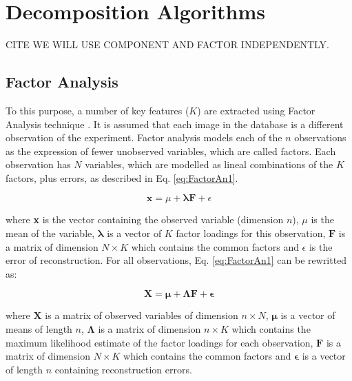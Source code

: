 \section{Decomposition Algorithms}
CITE WE WILL USE COMPONENT AND FACTOR INDEPENDENTLY. 

\subsection{Factor Analysis}
\cite{Martinez201141,Martinez-Murcia20129676}

To this purpose, a number of key features ($K$) are extracted using Fac\-tor A\-na\-ly\-sis technique \cite{Harman73}. It is assumed that each image in the database is a different observation of the experiment. Factor analysis models each of the $n$ observations as the expression of fewer unobserved variables, which are called factors. Each observation has $N$ variables, which are modelled as lineal combinations of the $K$ factors, plus errors, as described in Eq. \ref{eq:FactorAn1}.

\begin{equation}\label{eq:FactorAn1}
\textbf{x} = \mu + \boldsymbol\lambda \textbf{F} + \epsilon
\end{equation}

\noindent where \textbf{x} is the vector containing the observed variable (dimension $n$), $\mu$ is the mean of the variable, $\boldsymbol\lambda$ is a vector of $K$ factor loadings for this observation, $\textbf{F}$ is a matrix of dimension $N \times K$ which contains the common factors and $\epsilon$ is the error of reconstruction. For all observations, Eq. \ref{eq:FactorAn1} can be rewritted as:

\begin{equation}\label{eq:FactorAn2}
\textbf{X} = \boldsymbol\mu + \boldsymbol\Lambda \textbf{F} + \boldsymbol\epsilon
\end{equation}

\noindent where $\textbf{X}$ is a matrix of observed variables of dimension $n \times N$, $\boldsymbol\mu$ is a vector of means of length $n$, $\boldsymbol\Lambda$ is a matrix of dimension $n \times K$ which contains the maximum likelihood estimate of the factor loadings for each observation, $\textbf{F}$ is a matrix of dimension $N \times K$ which contains the common factors and $\boldsymbol\epsilon$ is a vector of length $n$ containing reconstruction errors.

